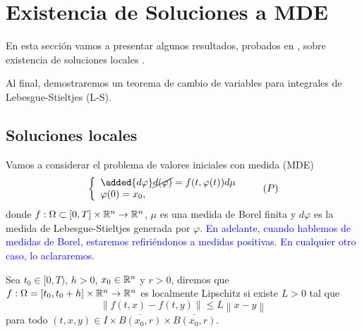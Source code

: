  
 
 
 
 
 
 
 \section{Existencia de Soluciones a MDE}
 
 
 
 
 
  En esta sección vamos a presentar algunos resultados, probados en \cite{P.Mazzone}, sobre existencia de soluciones locales . 


  
  Al final, demostraremos un teorema de cambio de variables para integrales de Lebesgue-Stieltjes (L-S). 
  
  
 \subsection{Soluciones locales}

 Vamos a considerar el problema de valores iniciales con medida (MDE)
 \begin{equation}\label{Problema P}
 	\left\lbrace \begin{array}{l}
 		\added{d\varphi}\cancel{d(\varphi)}=f(t,\varphi(t))d\mu\\
 		\varphi(0)=x_0,
 	\end{array}\right. \tag{${P}$}
 \end{equation}
 donde $f:\Omega\subset[0,T]\times\mathbb{R}^n\to\mathbb{R}^{n}$, $\mu$ es una medida de Borel  finita y $d\varphi$ es la medida de Lebesgue-Stieltjes generada por $\varphi$. \textcolor{blue}{ En adelante, cuando hablemos de medidas de Borel, estaremos refiriéndonos a medidas  positivas. En cualquier otro caso, lo aclararemos.}
 


\begin{defi}
    Sea $t_0\in [0,T)$, $h>0$,  $x_0\in \mathbb{R}^n$ y $r>0$, diremos que $f:\Omega=[t_0,t_0+h]\times\mathbb{R}^n\to\mathbb{R}^{n}$ es localmente Lipschitz  si  existe $ L>0$  tal que
	\begin{equation}\label{f lipschitz}
	\left\| f(t,x)-f(t,y)\right\|\leq L\left\| x-y\right\|
\end{equation}
	para todo $(t,x,y)\in I\times \overline{B(x_0,r)}\times \overline{B(x_0,r)}$.
\end{defi}

